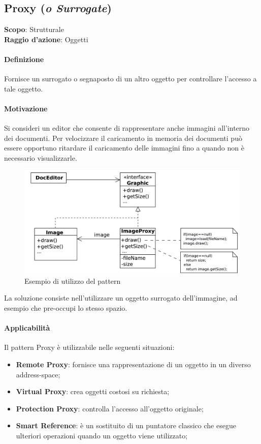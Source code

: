 \subsection{Proxy (\textit{o Surrogate})}
\label{proxy}

\textbf{Scopo}: Strutturale \\
\textbf{Raggio d'azione}: Oggetti

\paragraph{Definizione} Fornisce un surrogato o segnaposto di un altro oggetto per controllare l'accesso a tale oggetto.

\paragraph{Motivazione} Si consideri un editor che consente di rappresentare anche immagini all’interno dei documenti. Per velocizzare il caricamento in memoria dei documenti può essere opportuno ritardare il caricamento delle immagini fino a quando non è necessario visualizzarle.

\begin{figure}[H]
    \centering
    \includegraphics[width=0.75\linewidth]{assets/pattern/proxy/proxy-esempio.png}
    \caption{Esempio di utilizzo del pattern}
\end{figure}

La soluzione consiste nell'utilizzare un oggetto surrogato dell’immagine, ad esempio che pre-occupi lo stesso spazio.

\paragraph{Applicabilità} Il pattern Proxy è utilizzabile nelle seguenti situazioni:
\begin{itemize}
    \item \textbf{Remote Proxy}: fornisce una rappresentazione di un oggetto in un diverso address-space;
    \item \textbf{Virtual Proxy}: crea oggetti costosi su richiesta;
    \item \textbf{Protection Proxy}: controlla l'accesso all'oggetto originale;
    \item \textbf{Smart Reference}: è un sostituito di un puntatore classico che esegue ulteriori operazioni quando un oggetto viene utilizzato;
\end{itemize}

